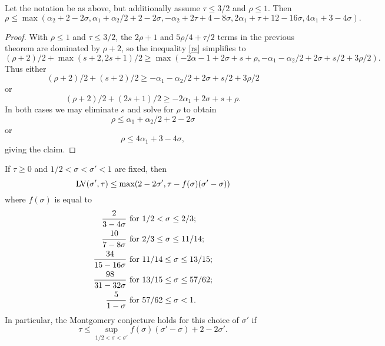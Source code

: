 \begin{corollary}\label{borg-lv-simp} \cite[Lemma 4.60]{bourgain_large_2000} Let the notation be as above, but additionally assume $\tau \leq 3/2$ and $\rho \leq 1$.  Then
$$ \rho \leq \max( \alpha_2 + 2 - 2 \sigma, \alpha_1+\alpha_2/2 + 2-2\sigma, -\alpha_2 + 2\tau+4-8\sigma, 2\alpha_1 + \tau + 12 - 16 \sigma, 4\alpha_1 + 3-4\sigma).$$
\end{corollary}

\begin{proof}  With $\rho \leq 1$ and $\tau \leq 3/2$, the $2\rho+1$ and $5\rho/4+\tau/2$ terms in the previous theorem are dominated by $\rho+2$, so the inequality \eqref{rs} simplifies to
$$(\rho+2)/2 + \max(s+2, 2s+1)/2 \geq
    \max( -2\alpha-1 + 2\sigma + s + \rho, -\alpha_1 - \alpha_2/2 + 2\sigma + s/2 + 3\rho/2).$$
Thus either
$$(\rho+2)/2 + (s+2)/2 \geq -\alpha_1 - \alpha_2/2 + 2\sigma + s/2 + 3\rho/2$$
or
$$(\rho+2)/2 + (2s+1)/2 \geq  -2\alpha_1 + 2\sigma + s + \rho.$$
In both cases we may eliminate $s$ and solve for $\rho$ to obtain
$$ \rho \leq \alpha_1 + \alpha_2/2 + 2 - 2 \sigma $$
or
$$ \rho \leq 4\alpha_1 + 3 - 4 \sigma,$$
giving the claim.
\end{proof}


\begin{theorem}\label{ivic-lvt-82}\cite[Lemma 8.2]{ivic}  If $\tau \geq 0$ and $1/2 < \sigma < \sigma' < 1$ are fixed, then
$$ \mathrm{LV}(\sigma', \tau) \leq \max( 2 - 2\sigma', \tau - f(\sigma) (\sigma'-\sigma) )$$
where $f(\sigma)$ is equal to
\begin{align*}
\frac{2}{3-4\sigma} &\hbox{ for } 1/2 < \sigma \leq 2/3; \\
\frac{10}{7-8\sigma} &\hbox{ for } 2/3 \leq \sigma \leq 11/14; \\
\frac{34}{15-16\sigma} &\hbox{ for } 11/14 \leq \sigma \leq 13/15; \\
\frac{98}{31-32\sigma} &\hbox{ for } 13/15 \leq \sigma \leq 57/62; \\
\frac{5}{1-\sigma} &\hbox{ for } 57/62 \leq \sigma < 1.
\end{align*}
In particular, the Montgomery conjecture holds for this choice of $\sigma'$ if
$$ \tau \leq \sup_{1/2 < \sigma < \sigma'} f(\sigma) (\sigma'-\sigma) + 2 - 2 \sigma'.$$
\end{theorem}
